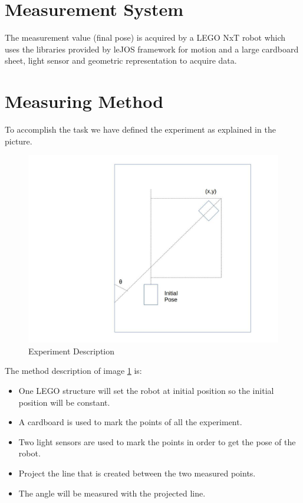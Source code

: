 \documentclass[10pt]{scrartcl}
\begin{document}
\section*{Measurement System}

The measurement value (final pose) is acquired by a LEGO NxT robot which uses the libraries provided by leJOS framework for motion and a large cardboard sheet, light sensor and geometric representation to acquire data. 

\section*{Measuring Method}

To accomplish the task we have defined the experiment as explained in the picture.\\

\begin{figure}[h!]
\centering
\includegraphics[trim=200 0 0 0, scale=0.35]{image}
\caption{Experiment Description}
\label{fig}
\end{figure}

The method description of image \ref{fig} is:
\begin{itemize}
	\item One LEGO structure will set the robot at initial position so the initial position will be constant.
	\item A cardboard is used to mark the points of all the experiment.
	\item Two light sensors are used to mark the points in order to get the pose of the robot.
	\item Project the line that is created between the two measured points.
	\item The angle will be measured with the projected line.
\end{itemize}
\end{document}

